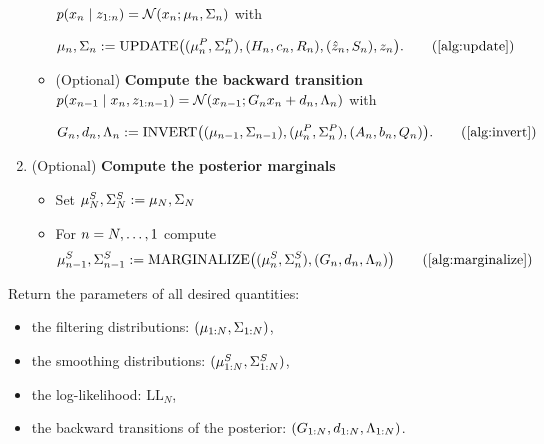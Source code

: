 \documentclass{mimosis}
\begin{document}
\begin{alg}
\begin{enumerate}[nosep]
\begin{itemize}
\(\p(\st_\idxt \mid \obs_{1:\idxt}) = \N( \st_\idxt; \mean{\idxt}, \cov{\idxt} )\)
with
\begin{fleqn}
\begin{equation*}
  \mean{\idxt}, \cov{\idxt} := \operatorname{UPDATE}\left(
    (\mean{\idxt}^P, \cov{\idxt}^P),
    (\obsA_\idxt, \obsb_\idxt, \obsC_\idxt),
    (\hat{\obs}_\idxt, S_\idxt),
    \obs_\idxt
  \right).
  \tag{\cref{alg:update}}
\end{equation*}
\end{fleqn}
\item (Optional) \textbf{Compute the backward transition}
\(\p(\st_{\idxt-1} \mid \st_\idxt, \obs_{1:\idxt-1}) = \N( \st_{\idxt-1}; \invtransA_\idxt \st_\idxt + \invtransb_\idxt, \invtransC_\idxt )\) with
\begin{fleqn}
\begin{equation*}
  \invtransA_\idxt, \invtransb_\idxt, \invtransC_\idxt := \operatorname{INVERT} \left(
    (\mean{{\idxt-1}}, \cov{{\idxt-1}}),
    (\mean{\idxt}^P, \cov{\idxt}^P),
    (\transA_\idxt, \transb_\idxt, \transC_\idxt)
  \right).
  \tag{\cref{alg:invert}}
\end{equation*}
\end{fleqn}
\end{itemize}
\item (Optional) \textbf{Compute the posterior marginals}
\begin{itemize}
\item Set \(\mu_{N}^S, \Sigma_{N}^S := \mu_{N}, \Sigma_{N}\)
\item For \(n = N, \dots, 1\) compute
\begin{equation*}
  \mean{{\idxt-1}}^S, \cov{{\idxt-1}}^S := \operatorname{MARGINALIZE}\left(
    (\mean{\idxt}^S, \cov{\idxt}^S),
    (\invtransA_\idxt, \invtransb_\idxt, \invtransC_\idxt)
  \right)
  \tag{\cref{alg:marginalize}}
\end{equation*}
\end{itemize}
\end{enumerate}
Return the parameters of all desired quantities:
\begin{itemize}[nosep]
\item the filtering distributions: \((\mu_{{1:N}}, \Sigma_{{1:N}})\),
\item the smoothing distributions: \((\mu_{{1:N}}^S, \Sigma_{{1:N}}^S)\),
\item the log-likelihood: \(\text{LL}_N\),
\item the backward transitions of the posterior: \((G_{1:N}, d_{1:N}, \Lambda_{1:N})\).
\end{itemize}
\end{alg}
\end{document}
